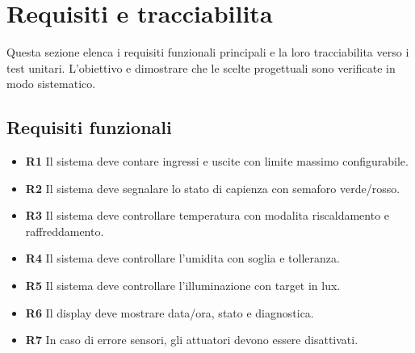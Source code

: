 \chapter{Requisiti e tracciabilita}

Questa sezione elenca i requisiti funzionali principali e la loro tracciabilita verso i test unitari. L'obiettivo e dimostrare che le scelte progettuali sono verificate in modo sistematico.

\section{Requisiti funzionali}
\begin{itemize}
  \item \textbf{R1} Il sistema deve contare ingressi e uscite con limite massimo configurabile.
  \item \textbf{R2} Il sistema deve segnalare lo stato di capienza con semaforo verde/rosso.
  \item \textbf{R3} Il sistema deve controllare temperatura con modalita riscaldamento e raffreddamento.
  \item \textbf{R4} Il sistema deve controllare l'umidita con soglia e tolleranza.
  \item \textbf{R5} Il sistema deve controllare l'illuminazione con target in lux.
  \item \textbf{R6} Il display deve mostrare data/ora, stato e diagnostica.
  \item \textbf{R7} In caso di errore sensori, gli attuatori devono essere disattivati.
\end{itemize}

